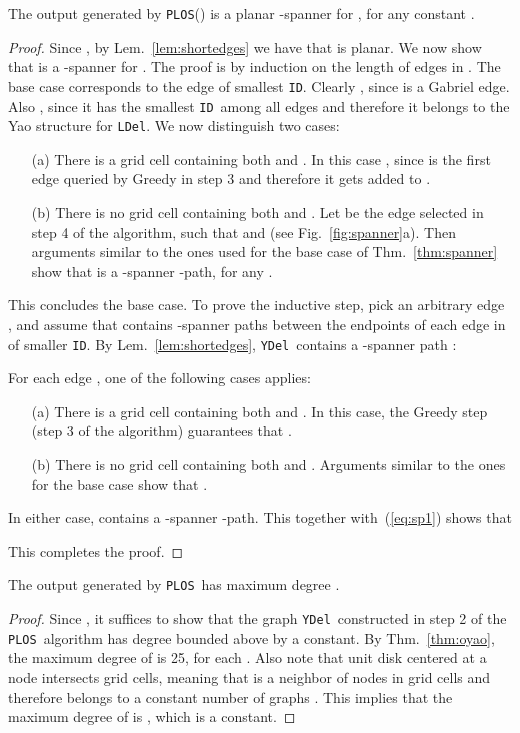\documentclass{llncs}
\newcommand{\ABox}{
\raisebox{3pt}{\framebox[6pt]{\rule{6pt}{0pt}}}
}
\newcommand{\id}{{\tt ID}}
\newcommand{\palg}{{\tt PLOS}}
\newcommand{\ydel}{{\tt YDel}}
\newcommand{\ldel}{{\tt LDel}}
\begin{document}
\begin{theorem}
The output  generated by \palg() is a planar -spanner for , for any constant .
\label{thm:pspanner}
\end{theorem}
\begin{proof}
Since , by Lem.~\ref{lem:shortedges} we have that  is planar. We now show that  is a -spanner for . The proof is by induction on the length of edges in . The base case corresponds to the edge   of smallest \id. Clearly , since  is a Gabriel edge. Also , since it has the smallest \id\ among all edges and therefore it belongs to the Yao structure for \ldel. We now distinguish two cases:
\begin{itemize}
\item [(a)] There is a grid cell containing both  and . In this case , since  is the first edge queried by Greedy in step 3 and therefore it gets added to .
\item [(b)] There is no grid cell containing both  and . Let  be the edge selected in step 4 of the algorithm, such that  and  (see Fig.~\ref{fig:spanner}a). Then arguments similar to the ones used for the base case of Thm.~\ref{thm:spanner} show that  is a -spanner -path, for any  . \end{itemize}
This concludes the base case. To prove the inductive step, pick an arbitrary edge , and assume that  contains -spanner paths between the endpoints of each edge in  of smaller \id. By Lem.~\ref{lem:shortedges}, \ydel\ contains a -spanner path :

For each edge , one of the following cases applies:
\begin{itemize}
\item [(a)] There is a grid cell containing both  and . In this case, the Greedy step (step 3 of the algorithm) guarantees that .
\item [(b)] There is no grid cell containing both  and . Arguments similar to the ones for the base case show that .
\end{itemize}
In either case,  contains a -spanner -path.
This together with~(\ref{eq:sp1}) shows that

This completes the proof. \hfill\ABox
\end{proof}

\begin{theorem}
The output  generated by \palg\ has maximum degree .
\label{thm:pdegree}
\end{theorem}
\begin{proof}
Since , it suffices to show that the graph \ydel\ constructed in step 2 of the \palg\ algorithm
has degree bounded above by a constant.
By Thm.~\ref{thm:oyao}, the maximum degree of  is 25, for each . Also note that unit disk centered at a node  intersects  grid cells, meaning that  is a neighbor of nodes in  grid cells and therefore belongs to a constant number of graphs . This implies that the maximum degree of  is , which is a constant. \hfill\ABox
\end{proof}
\end{document}
